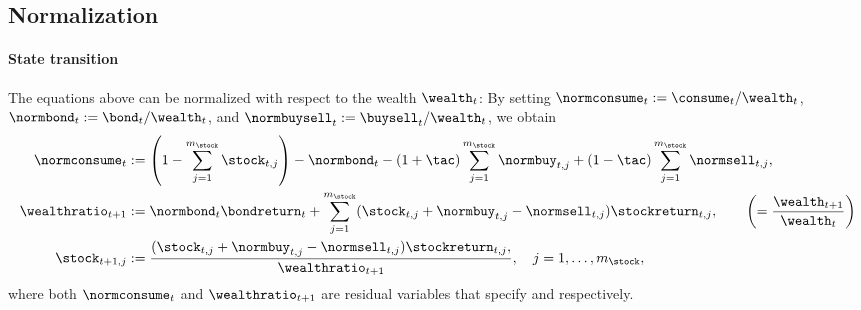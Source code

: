 \subsection{Normalization}
\label{sec:832normalized}

\paragraph{State transition}

The equations above can be normalized with respect to the wealth
$\wealth_t$:
By setting
$\normconsume_t := \consume_t/\wealth_t$,
$\normbond_t    := \bond_t   /\wealth_t$, and
$\normbuysell_t := \buysell_t/\wealth_t$, we obtain
\begin{subequations}
  \label{eq:normalizedTCPStateTransition}
  \begin{align}
    \normconsume_t
    &:= \paren*{1 - \sum_{j=1}^{m_{\stock}} \stock_{t,j}} - \normbond_t -
    (1 + \tac) \sum_{j=1}^{m_{\stock}} \normbuy_{t,j} +
    (1 - \tac) \sum_{j=1}^{m_{\stock}} \normsell_{t,j},\\
    \wealthratio_{t+1}
    &:= \normbond_t \bondreturn_t + \sum_{j=1}^{m_{\stock}}
    (\stock_{t,j} + \normbuy_{t,j} - \normsell_{t,j}) \stockreturn_{t,j},
    \qquad\left(= \frac{\wealth_{t+1}}{\wealth_t}\right)\\
    \stock_{t+1,j}
    &:= \frac{
      (\stock_{t,j} + \normbuy_{t,j} - \normsell_{t,j}) \stockreturn_{t,j},
    }{\wealthratio_{t+1}},\quad
    j = 1, \dotsc, m_{\stock},
  \end{align}
\end{subequations}
where both $\normconsume_t$ and $\wealthratio_{t+1}$ are residual
variables that specify  and
 respectively.

